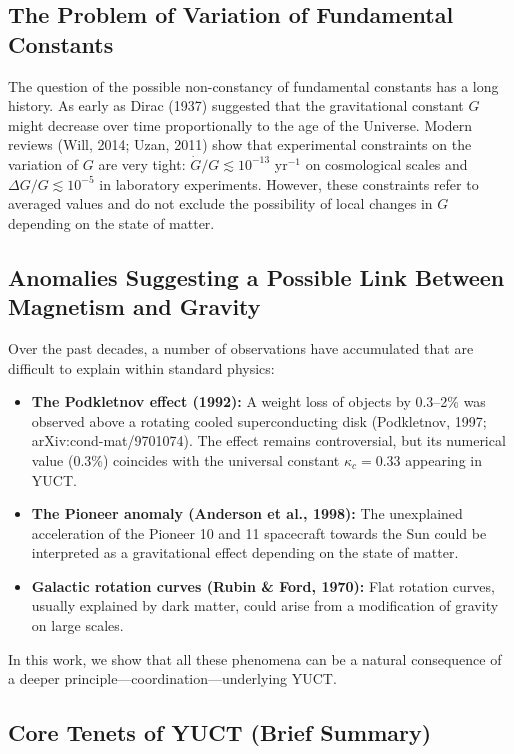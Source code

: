 \documentclass[12pt]{article}
\theoremstyle{remark}
\newcommand{\kappac}{\kappa_c}
\begin{document}
	\subsection{The Problem of Variation of Fundamental Constants}
	\label{subsec:constants-variation}
	
	The question of the possible non-constancy of fundamental constants has a long history. As early as Dirac (1937) suggested that the gravitational constant $G$ might decrease over time proportionally to the age of the Universe. Modern reviews (Will, 2014; Uzan, 2011) show that experimental constraints on the variation of $G$ are very tight: $\dot{G}/G \lesssim 10^{-13}$ yr$^{-1}$ on cosmological scales and $\Delta G/G \lesssim 10^{-5}$ in laboratory experiments. However, these constraints refer to averaged values and do not exclude the possibility of local changes in $G$ depending on the state of matter.
	
	\subsection{Anomalies Suggesting a Possible Link Between Magnetism and Gravity}
	\label{subsec:anomalies}
	
	Over the past decades, a number of observations have accumulated that are difficult to explain within standard physics:
	\begin{itemize}
		\item \textbf{The Podkletnov effect (1992):} A weight loss of objects by 0.3–2\% was observed above a rotating cooled superconducting disk (Podkletnov, 1997; arXiv:cond-mat/9701074). The effect remains controversial, but its numerical value (0.3\%) coincides with the universal constant $\kappac = 0.33$ appearing in YUCT.
		\item \textbf{The Pioneer anomaly (Anderson et al., 1998):} The unexplained acceleration of the Pioneer 10 and 11 spacecraft towards the Sun could be interpreted as a gravitational effect depending on the state of matter.
		\item \textbf{Galactic rotation curves (Rubin \& Ford, 1970):} Flat rotation curves, usually explained by dark matter, could arise from a modification of gravity on large scales.
	\end{itemize}
	In this work, we show that all these phenomena can be a natural consequence of a deeper principle—coordination—underlying YUCT.
	
	\subsection{Core Tenets of YUCT (Brief Summary)}
	\label{subsec:yuct-core}
	
\end{document}
